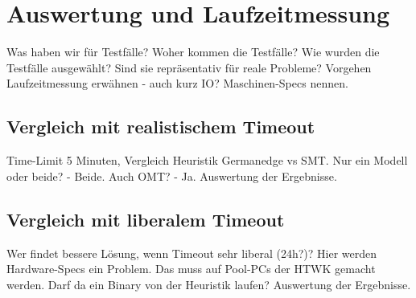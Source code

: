 \section{Auswertung und Laufzeitmessung}

Was haben wir für Testfälle?
Woher kommen die Testfälle?
Wie wurden die Testfälle ausgewählt?
Sind sie repräsentativ für reale Probleme?
Vorgehen Laufzeitmessung erwähnen - auch kurz IO?
Maschinen-Specs nennen.

\subsection{Vergleich mit realistischem Timeout}
Time-Limit 5 Minuten, Vergleich Heuristik Germanedge vs SMT.
Nur ein Modell oder beide? - Beide.
Auch OMT? - Ja.
Auswertung der Ergebnisse.

\subsection{Vergleich mit liberalem Timeout}
Wer findet bessere Lösung, wenn Timeout sehr liberal (24h?)?
Hier werden Hardware-Specs ein Problem.
Das muss auf Pool-PCs der HTWK gemacht werden.
Darf da ein Binary von der Heuristik laufen?
Auswertung der Ergebnisse.
